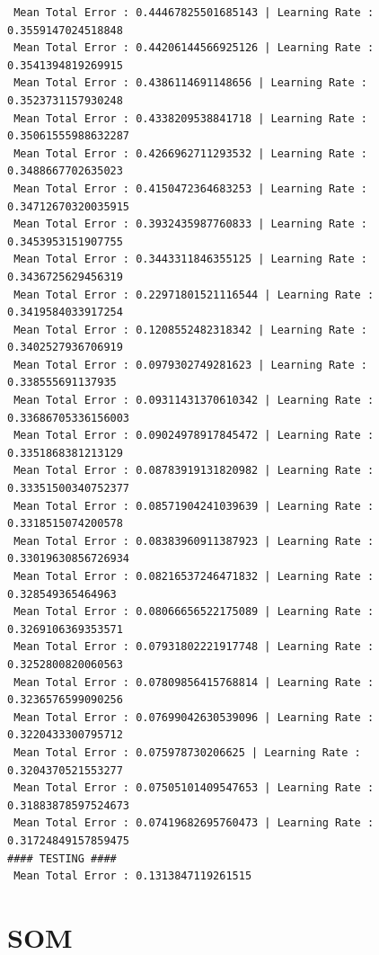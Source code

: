 \documentclass[]{report}
\begin{document}
\begin{verbatim}
 Mean Total Error : 0.44467825501685143 | Learning Rate : 0.3559147024518848
 Mean Total Error : 0.44206144566925126 | Learning Rate : 0.3541394819269915
 Mean Total Error : 0.4386114691148656 | Learning Rate : 0.3523731157930248
 Mean Total Error : 0.4338209538841718 | Learning Rate : 0.35061555988632287
 Mean Total Error : 0.4266962711293532 | Learning Rate : 0.3488667702635023
 Mean Total Error : 0.4150472364683253 | Learning Rate : 0.34712670320035915
 Mean Total Error : 0.3932435987760833 | Learning Rate : 0.3453953151907755
 Mean Total Error : 0.3443311846355125 | Learning Rate : 0.3436725629456319
 Mean Total Error : 0.22971801521116544 | Learning Rate : 0.3419584033917254
 Mean Total Error : 0.1208552482318342 | Learning Rate : 0.3402527936706919
 Mean Total Error : 0.0979302749281623 | Learning Rate : 0.338555691137935
 Mean Total Error : 0.09311431370610342 | Learning Rate : 0.33686705336156003
 Mean Total Error : 0.09024978917845472 | Learning Rate : 0.3351868381213129
 Mean Total Error : 0.08783919131820982 | Learning Rate : 0.33351500340752377
 Mean Total Error : 0.08571904241039639 | Learning Rate : 0.3318515074200578
 Mean Total Error : 0.08383960911387923 | Learning Rate : 0.33019630856726934
 Mean Total Error : 0.08216537246471832 | Learning Rate : 0.328549365464963
 Mean Total Error : 0.08066656522175089 | Learning Rate : 0.3269106369353571
 Mean Total Error : 0.07931802221917748 | Learning Rate : 0.3252800820060563
 Mean Total Error : 0.07809856415768814 | Learning Rate : 0.3236576599090256
 Mean Total Error : 0.07699042630539096 | Learning Rate : 0.3220433300795712
 Mean Total Error : 0.075978730206625 | Learning Rate : 0.3204370521553277
 Mean Total Error : 0.07505101409547653 | Learning Rate : 0.31883878597524673
 Mean Total Error : 0.07419682695760473 | Learning Rate : 0.31724849157859475
#### TESTING ####
 Mean Total Error : 0.1313847119261515
\end{verbatim}
\section{SOM}
\end{document}
